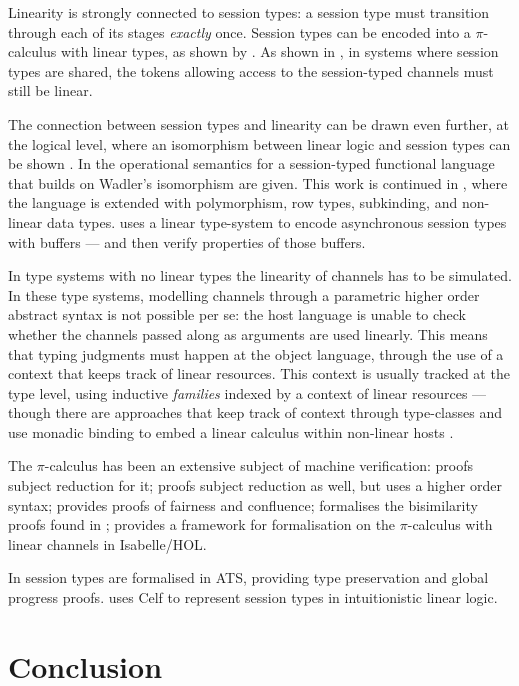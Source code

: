 \documentclass{mproj}
\newcommand{\picalc}{$\pi$-calculus}
\begin{document}
Linearity is strongly connected to session types: a session type must transition through each of its stages \emph{exactly} once. Session types can be encoded into a \picalc{} with linear types, as shown by \cite{Kobayashi1996,Dardha2012,Dardha2016}. As shown in \cite{Voinea}, in systems where session types are shared, the tokens allowing access to the session-typed channels must still be linear.

The connection between session types and linearity can be drawn even further, at the logical level, where an isomorphism between linear logic and session types can be shown \cite{Caires2010} \cite{Wadler2014}. In \cite{Lindley2015} the operational semantics for a session-typed functional language that builds on Wadler's isomorphism are given. This work is continued in \cite{Lindley}, where the language is extended with polymorphism, row types, subkinding, and non-linear data types. \cite{Gay2010} uses a linear type-system to encode asynchronous session types with buffers --- and then verify properties of those buffers.

In type systems with no linear types the linearity of channels has to be simulated. In these type systems, modelling channels through a parametric higher order abstract syntax \cite{Chlipala2008} is not possible per se: the host language is unable to check whether the channels passed along as arguments are used linearly. This means that typing judgments must happen at the object language, through the use of a context that keeps track of linear resources.  This context is usually tracked at the type level, using inductive \emph{families} \cite{Dybjer1994} indexed by a context of linear resources \cite{Power2000} --- though there are approaches that keep track of context through type-classes and use monadic binding to embed a linear calculus within non-linear hosts \cite{Paykin2017}.

The \picalc{} has been an extensive subject of machine verification: \cite{Henry-Gerard1999} proofs subject reduction for it; \cite{Despeyroux2000} proofs subject reduction as well, but uses a higher order syntax; \cite{Affeldt2008} provides proofs of fairness and confluence; \cite{Honsell2001} formalises the bisimilarity proofs found in \cite{Walker1989}; \cite{Gay2001} provides a framework for formalisation on the \picalc{} with linear channels in Isabelle/HOL.

In \cite{Xi2016} session types are formalised in ATS, providing type preservation and global progress proofs. \cite{Bock2016} uses Celf to represent session types in intuitionistic linear logic.
\chapter{Conclusion}\label{conclusion}



\end{document}

